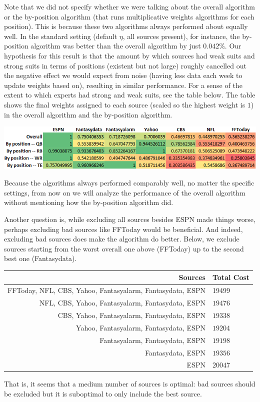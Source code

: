 \documentclass[12pt, final, onecolumn, titlepage]{article}
\theoremstyle{definition}
\begin{document}
Note that we did not specify whether we were talking about the overall algorithm or the by-position algorithm (that runs multiplicative weights algorithms for each position). This is because these two algorithms always performed about equally well. In the standard setting (default $\eta$, all sources present), for instance, the by-position algorithm was better than the overall algorithm by just $0.042\%$. Our hypothesis for this result is that the amount by which sources had weak suits and strong suits in terms of positions (existent but not large) roughly cancelled out the negative effect we would expect from noise (having less data each week to update weights based on), resulting in similar performance. For a sense of the extent to which experts had strong and weak suits, see the table below. The table shows the final weights assigned to each source (scaled so the highest weight is $1$) in the overall algorithm and the by-position algorithm.
\begin{center}
\includegraphics[scale=0.8]{Scaled_Weights.png}
\end{center}
Because the algorithms always performed comparably well, no matter the specific settings, from now on we will analyze the performance of the overall algorithm without mentioning how the by-position algorithm did.

Another question is, while excluding all sources besides ESPN made things worse, perhaps excluding bad sources like FFToday would be beneficial. And indeed, excluding bad sources does make the algorithm do better. Below, we exclude sources starting from the worst overall one above (FFToday) up to the second best one (Fantasydata).

\begin{center}
\begin{tabular}{|r|l|}
\hline
Sources & Total Cost\\
\hline
FFToday, NFL, CBS, Yahoo, Fantasyalarm, Fantasydata, ESPN & 19499\\
NFL, CBS, Yahoo, Fantasyalarm, Fantasydata, ESPN & $19476$\\
CBS, Yahoo, Fantasyalarm, Fantasydata, ESPN & $19338$\\
Yahoo, Fantasyalarm, Fantasydata, ESPN & $19204$\\
Fantasyalarm, Fantasydata, ESPN & $19198$\\
Fantasydata, ESPN & $19356$\\
ESPN & $20047$\\
\hline
\end{tabular}
\end{center}
That is, it seems that a medium number of sources is optimal: bad sources should be excluded but it is suboptimal to only include the best source.
\end{document}
